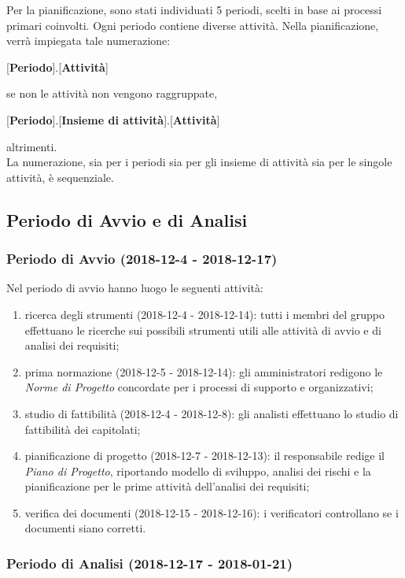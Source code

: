 Per la pianificazione, sono stati individuati 5 periodi, scelti in base ai processi primari coinvolti. Ogni periodo contiene diverse attività. Nella pianificazione, verrà impiegata tale numerazione:
\begin{center}
	[\textbf{Periodo}].[\textbf{Attività}]
\end{center}
se non le attività non vengono raggruppate,
\begin{center}
	[\textbf{Periodo}].[\textbf{Insieme di attività}].[\textbf{Attività}]
\end{center}
altrimenti.\\
La numerazione, sia per i periodi sia per gli insieme di attività sia per le singole attività, è sequenziale.

\subsection{Periodo di Avvio e di Analisi}
	\subsubsection{Periodo di Avvio (2018-12-4 - 2018-12-17)}
		Nel periodo di avvio hanno luogo le seguenti attività:
		\begin{enumerate}[label = 1.\arabic*)]
			\item ricerca degli strumenti (2018-12-4 - 2018-12-14): tutti i membri del gruppo effettuano le ricerche sui possibili strumenti utili alle attività di avvio e di analisi dei requisiti;
			\item prima normazione (2018-12-5 - 2018-12-14): gli amministratori redigono le \textit{Norme di Progetto} concordate per i processi di supporto e organizzativi;
			\item studio di fattibilità (2018-12-4 - 2018-12-8): gli analisti effettuano lo studio di fattibilità dei capitolati;
			\item pianificazione di progetto (2018-12-7 - 2018-12-13): il responsabile redige il \textit{Piano di Progetto}, riportando modello di sviluppo, analisi dei rischi e la pianificazione per le prime attività dell'analisi dei requisiti;
			\item verifica dei documenti (2018-12-15 - 2018-12-16): i verificatori controllano se i documenti siano corretti.
		\end{enumerate}
	\subsubsection{Periodo di Analisi (2018-12-17 - 2018-01-21)}	
